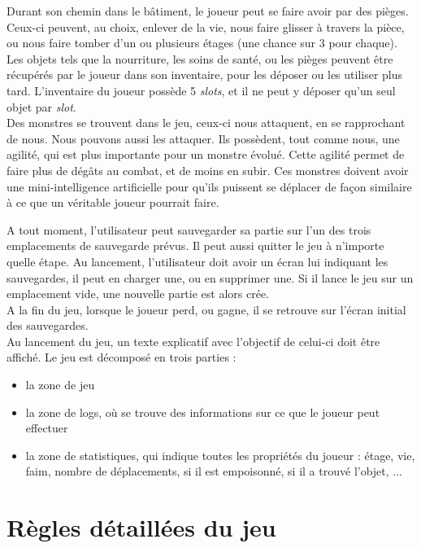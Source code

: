 \documentclass[11pt]{report}
\begin{document}
	Durant son chemin dans le bâtiment, le joueur peut se faire avoir par des pièges. Ceux-ci peuvent, au choix, enlever de la vie, nous faire glisser à travers la pièce, ou nous faire tomber d'un ou plusieurs étages (une chance sur 3 pour chaque).\\
	Les objets tels que la nourriture, les soins de santé, ou les pièges peuvent être récupérés par le joueur dans son inventaire, pour les déposer ou les utiliser plus tard. L'inventaire du joueur possède 5 \emph{slots}, et il ne peut y déposer qu'un seul objet par \emph{slot}.\\
	Des monstres se trouvent dans le jeu, ceux-ci nous attaquent, en se rapprochant de nous. Nous pouvons aussi les attaquer. Ils possèdent, tout comme nous, une agilité, qui est plus importante pour un monstre évolué. Cette agilité permet de faire plus de dégâts au combat, et de moins en subir. Ces monstres doivent avoir une mini-intelligence artificielle pour qu'ils puissent se déplacer de façon similaire à ce que un véritable joueur pourrait faire.
	
	\vspace{12pt}

	A tout moment, l'utilisateur peut sauvegarder sa partie sur l'un des trois emplacements de sauvegarde prévus. Il peut aussi quitter le jeu à n'importe quelle étape. Au lancement, l'utilisateur doit avoir un écran lui indiquant les sauvegardes, il peut en charger une, ou en supprimer une. Si il lance le jeu sur un emplacement vide, une nouvelle partie est alors crée.\\
	A la fin du jeu, lorsque le joueur perd, ou gagne, il se retrouve sur l'écran initial des sauvegardes.\\
	Au lancement du jeu, un texte explicatif avec l'objectif de celui-ci doit être affiché. Le jeu est décomposé en trois parties :
	\begin{itemize}
	\item la zone de jeu
	\item la zone de logs, où se trouve des informations sur ce que le joueur peut effectuer
	\item la zone de statistiques, qui indique toutes les propriétés du joueur : étage, vie, faim, nombre de déplacements, si il est empoisonné, si il a trouvé l'objet, ...
	\end{itemize}
	
	\section{Règles détaillées du jeu}
	
\end{document}
